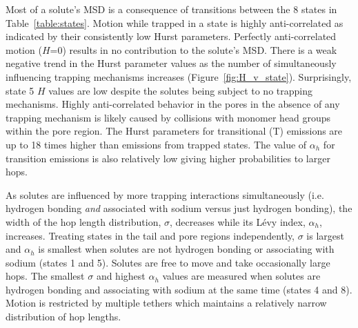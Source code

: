 \documentclass{article}
\begin{document}
  Most of a solute's MSD is a consequence of transitions between the 8 states
  in Table~\ref{table:states}. Motion while trapped in a state is highly 
  anti-correlated as indicated by their consistently low Hurst parameters.
  Perfectly anti-correlated motion ($H$=0) results in no contribution to the solute's
  MSD. There is a weak negative trend in the Hurst parameter values as the number
  of simultaneously influencing trapping mechanisms increases (Figure~\ref{fig:H_v_state}). 
  Surprisingly, state 5 $H$ values are low despite the solutes being subject to no
  trapping mechanisms. Highly anti-correlated behavior in the pores in the absence of
  any trapping mechanism is likely caused by collisions with monomer head groups 
  within the pore region. The Hurst parameters for transitional (T) emissions are up to 
  18 times higher than emissions from trapped states. The value of $\alpha_h$ for 
  transition emissions is also relatively low giving higher probabilities to larger hops.
  
  As solutes are influenced by more trapping interactions simultaneously (i.e. hydrogen
  bonding \textit{and} associated with sodium versus just hydrogen bonding), the 
  width of the hop length distribution, $\sigma$, decreases while its L\'evy index,
  $\alpha_h$, increases. Treating states in the tail and pore regions independently, 
  $\sigma$ is largest and $\alpha_h$ is smallest when solutes are not hydrogen bonding
  or associating with sodium (states 1 and 5). Solutes are free to move and take 
  occasionally large hops. The smallest $\sigma$ and highest $\alpha_h$ values are
  measured when solutes are hydrogen bonding and associating with sodium at the
  same time (states 4 and 8). Motion is restricted by multiple tethers which 
  maintains a relatively narrow distribution of hop lengths.
  
  
\end{document}

